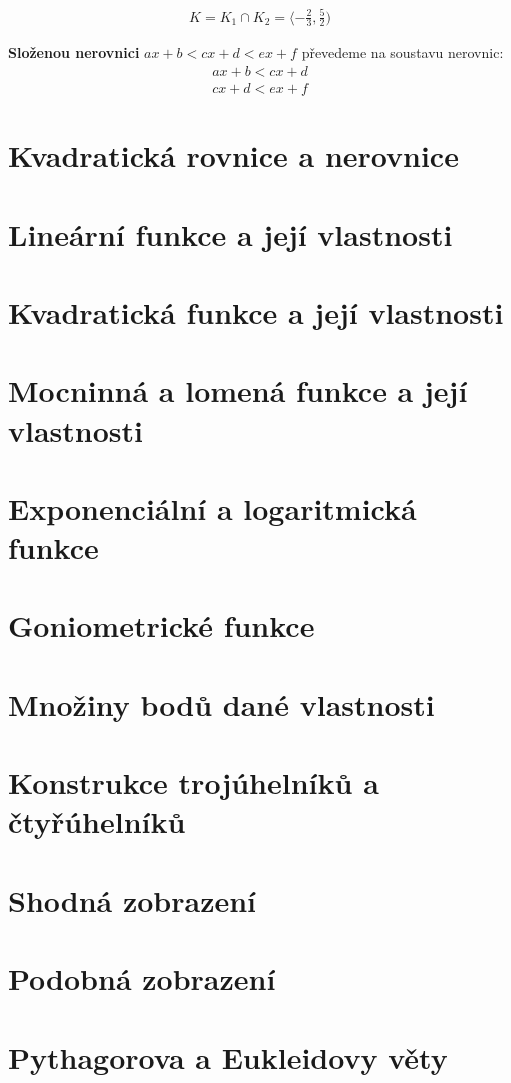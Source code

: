 \documentclass[12pt, a4paper]{article}
\begin{document}
\[
\begin{aligned} 
K = K_1 \cap K_2 = \langle - \frac{2}{3}, \frac{5}{2})
\end{aligned}
\]

\textbf{Složenou nerovnici} $ax + b < cx + d < ex + f$ převedeme na soustavu nerovnic:
\[ 
\begin{aligned}
ax + b < cx + d\\
cx + d < ex + f
\end{aligned}
\]

\section{Kvadratická rovnice a nerovnice}
\section{Lineární funkce a její vlastnosti}
\section{Kvadratická funkce a její vlastnosti}
\section{Mocninná a lomená funkce a její vlastnosti}
\section{Exponenciální a logaritmická funkce}
\section{Goniometrické funkce}
\section{Množiny bodů dané vlastnosti}
\section{Konstrukce trojúhelníků a čtyřúhelníků}
\section{Shodná zobrazení}
\section{Podobná zobrazení}
\section{Pythagorova a Eukleidovy věty}
\end{document}
